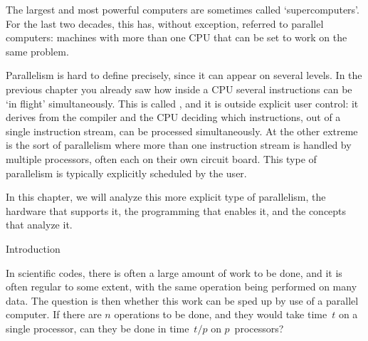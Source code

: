
The largest and most powerful computers are sometimes called
`supercomputers'. For the last two decades, this has, without
exception, referred to parallel computers: machines with more than one
CPU that can be set to work on the same problem.

Parallelism is hard to define precisely, since it can appear on
several levels. In the previous chapter you already saw how inside a
CPU several instructions can be `in flight' simultaneously. This is
called , and it is outside
explicit user control: it derives from the compiler and the CPU
deciding which instructions, out of a single instruction stream, can
be processed simultaneously. At the other extreme is the sort of
parallelism where more than one instruction stream is handled by
multiple processors, often each on their own circuit board. This type
of parallelism is typically explicitly scheduled by the user.

In this chapter, we will analyze this more explicit type of
parallelism, the hardware that supports it, the programming that
enables it, and the concepts that analyze it.

 {Introduction}
\label{sec:parallel-intro}

In scientific codes, there is often a large amount of work to be done,
and it is often regular to some extent, with the same operation being
performed on many data. The question is then whether this work can be
sped up by use of a parallel computer. If there are $n$ operations to
be done, and they would take time~$t$ on a single processor, can they
be done in time~$t/p$ on $p$~processors?

